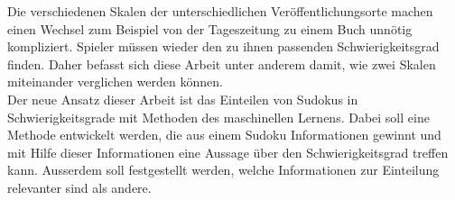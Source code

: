 Die verschiedenen Skalen der unterschiedlichen Veröffentlichungsorte machen einen Wechsel zum Beispiel von der Tageszeitung zu einem Buch unnötig kompliziert. Spieler müssen wieder den zu ihnen passenden Schwierigkeitsgrad finden. Daher befasst sich diese Arbeit unter anderem damit, wie zwei Skalen miteinander verglichen werden können.\\
Der neue Ansatz dieser Arbeit ist das Einteilen von Sudokus in Schwierigkeitsgrade mit Methoden des maschinellen Lernens. Dabei soll eine Methode entwickelt werden, die aus einem Sudoku Informationen gewinnt und mit Hilfe dieser Informationen eine Aussage über den Schwierigkeitsgrad treffen kann. Ausserdem soll festgestellt werden, welche Informationen zur Einteilung relevanter sind als andere.